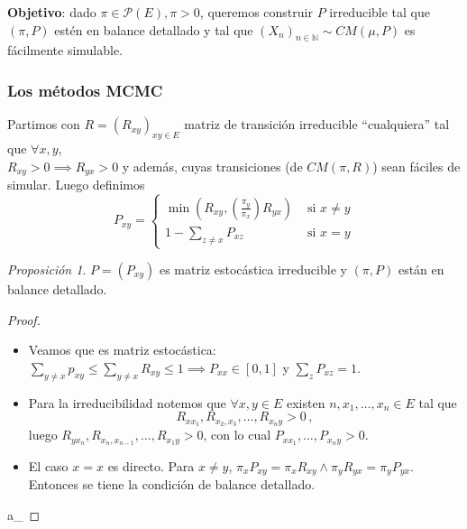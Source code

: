 \documentclass[letterpaper,11pt]{article} %
\theoremstyle{defbreak}
\theoremstyle{propbreak}
\theoremstyle{remark}
\theoremstyle{break}
\newtheorem{proposition}{Proposición}[subsection]
\def\N{\mathbb{N}}
\def\beforeitemize{\leavevmode \vspace{-0.5\baselineskip}}
\def\gris{\color{mygray}}
\def\negro{\color{black}}
\def\findem{\null\hfill\color{white}a\color{black}_\square}
\begin{document}
\newp \textbf{Objetivo}: dado $\pi\in\mathcal{P}(E),\pi>0$, queremos construir $P$ irreducible tal que $(\pi,P)$ estén en balance detallado y tal que $(X_n)_{n\in\N}\sim CM(\mu,P)$ es fácilmente simulable.
\subsubsection{Los métodos MCMC}
Partimos con $R=(R_{xy})_{xy\in E}$ matriz de transición irreducible ``cualquiera'' tal que $\forall x,y$,\\ $R_{xy}>0\implies R_{yx}>0$ y además, cuyas transiciones (de $CM(\pi,R)$) sean fáciles de simular.
\newline Luego definimos
$$ P_{xy}=\begin{cases}
\min(R_{xy},(\frac{\pi_y}{\pi_x})R_{yx})  & \mbox{ si }x\neq y\\
1-\displaystyle\sum_{z\neq x}P_{xz}  & \mbox{ si }x=y
\end{cases}$$
\begin{proposition}
$P=(P_{xy})$ es matriz estocástica irreducible y $(\pi,P)$ están en balance detallado.
\end{proposition}
\begin{proof}
\gris
\beforeitemize
\begin{itemize}
    \item Veamos que es matriz estocástica: $\sum_{y\neq x}p_{xy}\leq \sum_{y\neq x}R_{xy}\leq 1 \implies P_{xx}\in[0,1]$ y $\sum_z P_{xz}=1$.
    \item Para la irreducibilidad notemos que $\forall x,y\in E$ existen $n,x_1,\dots,x_n\in E$ tal que 
    $$R_{xx_1},R_{x_2,x_3},\dots,R_{x_ny}>0\,,$$
    luego $R_{yx_n},R_{x_n,x_{n-1}},\dots,R_{x_1y}>0$, con lo cual $P_{xx_1},\dots,P_{x_ny}>0$.
    \item El caso $x=x$ es directo. Para $x\neq y$, $\pi_xP_{xy}=\pi_xR_{xy}\land \pi_yR_{yx}=\pi_yP_{yx}$. \\ Entonces se tiene la condición de balance detallado.
\end{itemize}
\findem
\negro
\end{proof}
\end{document}
